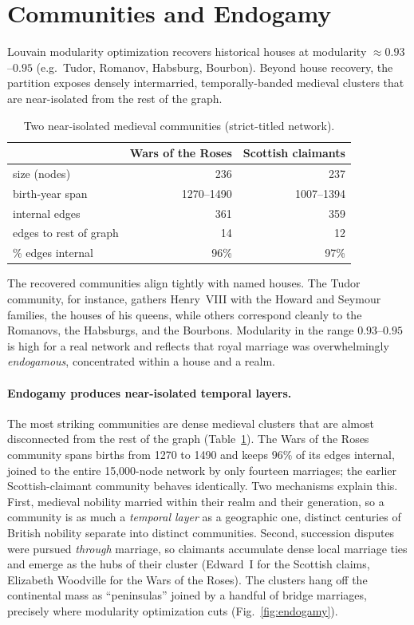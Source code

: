 \section{Communities and Endogamy}
\label{sec:communities}

Louvain modularity optimization \cite{blondel2008louvain,fortunato2010community} recovers historical
houses at modularity $\approx 0.93$--$0.95$ (e.g.\ Tudor, Romanov, Habsburg,
Bourbon). Beyond house recovery, the partition exposes densely intermarried,
temporally-banded medieval clusters that are near-isolated from the rest of the
graph.

\begin{table}[H]
\caption{Two near-isolated medieval communities (strict-titled network).}
\label{tab:endogamy}
\centering\small
\begin{tabular}{lrr}
\toprule
 & Wars of the Roses & Scottish claimants \\
\midrule
size (nodes)          & 236 & 237 \\
birth-year span       & 1270--1490 & 1007--1394 \\
internal edges        & 361 & 359 \\
edges to rest of graph& 14  & 12  \\
\% edges internal     & 96\% & 97\% \\
\bottomrule
\end{tabular}
\end{table}

The recovered communities align tightly with named houses. The Tudor community,
for instance, gathers Henry~VIII with the Howard and Seymour families, the houses
of his queens, while others correspond cleanly to the Romanovs, the Habsburgs,
and the Bourbons. Modularity in the range $0.93$--$0.95$ is high for a real
network and reflects that royal marriage was overwhelmingly \emph{endogamous},
concentrated within a house and a realm.

\paragraph{Endogamy produces near-isolated temporal layers.}
The most striking communities are dense medieval clusters that are almost
disconnected from the rest of the graph (Table~\ref{tab:endogamy}). The Wars of
the Roses community spans births from 1270 to 1490 and keeps $96\%$ of its edges
internal, joined to the entire 15{,}000-node network by only fourteen marriages;
the earlier Scottish-claimant community behaves identically. Two mechanisms
explain this. First, medieval nobility married within their realm and their
generation, so a community is as much a \emph{temporal layer} as a geographic
one, distinct centuries of British nobility separate into distinct communities.
Second, succession disputes were pursued \emph{through} marriage, so claimants
accumulate dense local marriage ties and emerge as the hubs of their cluster
(Edward~I for the Scottish claims, Elizabeth Woodville for the Wars of the Roses).
The clusters hang off the continental mass as ``peninsulas'' joined by a handful
of bridge marriages, precisely where modularity optimization cuts
(Fig.~\ref{fig:endogamy}).


